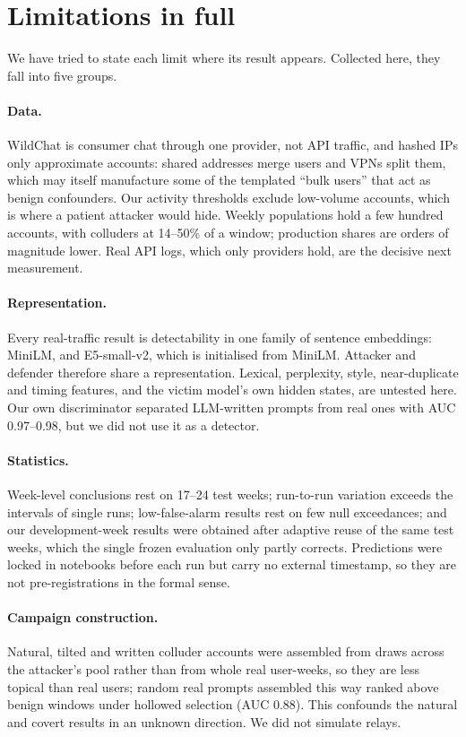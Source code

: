 \section{Limitations in full}
\label{sec:limitations-full}

We have tried to state each limit where its result appears. Collected here, they fall into five groups.

\paragraph{Data.} WildChat is consumer chat through one provider, not API traffic, and hashed IPs only approximate accounts: shared addresses merge users and VPNs split them, which may itself manufacture some of the templated ``bulk users'' that act as benign confounders. Our activity thresholds exclude low-volume accounts, which is where a patient attacker would hide. Weekly populations hold a few hundred accounts, with colluders at 14--50\% of a window; production shares are orders of magnitude lower. Real API logs, which only providers hold, are the decisive next measurement.

\paragraph{Representation.} Every real-traffic result is detectability in one family of sentence embeddings: MiniLM, and E5-small-v2, which is initialised from MiniLM. Attacker and defender therefore share a representation. Lexical, perplexity, style, near-duplicate and timing features, and the victim model's own hidden states, are untested here. Our own discriminator separated LLM-written prompts from real ones with AUC 0.97--0.98, but we did not use it as a detector.

\paragraph{Statistics.} Week-level conclusions rest on 17--24 test weeks; run-to-run variation exceeds the intervals of single runs; low-false-alarm results rest on few null exceedances; and our development-week results were obtained after adaptive reuse of the same test weeks, which the single frozen evaluation only partly corrects. Predictions were locked in notebooks before each run but carry no external timestamp, so they are not pre-registrations in the formal sense.

\paragraph{Campaign construction.} Natural, tilted and written colluder accounts were assembled from draws across the attacker's pool rather than from whole real user-weeks, so they are less topical than real users; random real prompts assembled this way ranked above benign windows under hollowed selection (AUC 0.88). This confounds the natural and covert results in an unknown direction. We did not simulate relays.

